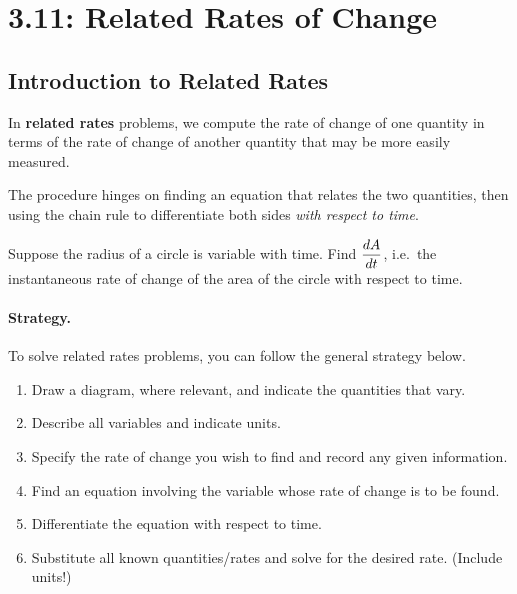 \documentclass[12pt]{article}
\begin{document}
\section*{3.11: Related Rates of Change}


\vspace{5mm}

\subsection*{Introduction to Related Rates}

In \textbf{related rates} problems, we compute the rate of change of one quantity in terms of the rate of change of another quantity that may be more easily measured.

\vspace{3mm}

The procedure hinges on finding an equation that relates the two quantities, then using the chain rule to differentiate both sides \textit{with respect to time}.

\vspace{3mm}

\Example Suppose the radius of a circle is variable with time. Find $\displaystyle\frac{dA}{dt}$, i.e.\ the instantaneous rate of change of the area of the circle with respect to time.

\vspace{50mm}

\paragraph{Strategy.} To solve related rates problems, you can follow the general strategy below.

\begin{enumerate}
\item[\tc{1}] Draw a diagram, where relevant, and indicate the quantities that vary.
\item[\tc{2}] Describe all variables and indicate units.
\item[\tc{3}] Specify the rate of change you wish to find and record any given information.
\item[\tc{4}] Find an equation involving the variable whose rate of change is to be found.
\item[\tc{5}] Differentiate the equation with respect to time.
\item[\tc{6}] Substitute all known quantities/rates and solve for the desired rate. (Include units!)
\end{enumerate}
\end{document}
